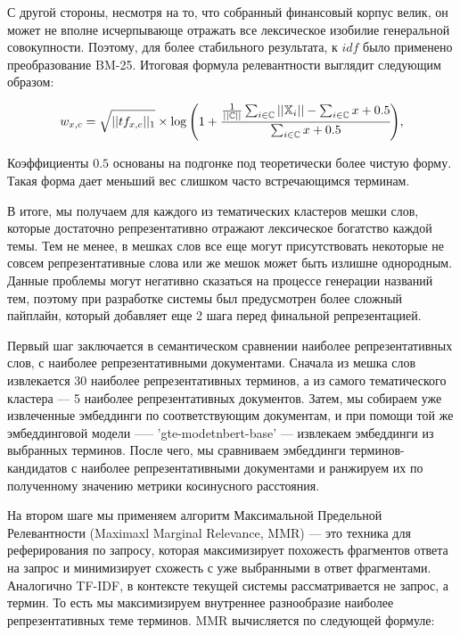 С другой стороны, несмотря на то, что собранный финансовый корпус велик, он может
не вполне исчерпывающе отражать все лексическое изобилие генеральной совокупности.
Поэтому, для более стабильного результата, к $idf$ было применено преобразование BM-25.
Итоговая формула релевантности выглядит следующим образом:

\begin{equation}
    w_{x, c} =
    \sqrt{||tf_{x, c}||_1}
    \times
    \log\Bigg(
        1 + \cfrac{
            \frac{1}{||\mathbb{C}||}\sum_{i \in \mathbb{C}}||\mathbb{X}_i|| - \sum_{i \in \mathbb{C}}x + 0.5
        }{
            \sum_{i \in \mathbb{C}}x + 0.5
        }
    \Bigg),
\end{equation}

Коэффициенты $0.5$ основаны на подгонке под теоретически более чистую форму.
Такая форма дает меньший вес слишком часто встречающимся терминам.

В итоге, мы получаем для каждого из тематических кластеров мешки слов, которые
достаточно репрезентативно отражают лексическое богатство каждой темы. Тем не менее,
в мешках слов все еще могут присутствовать некоторые не совсем репрезентативные слова
или же мешок может быть излишне однородным. Данные проблемы могут негативно сказаться
на процессе генерации названий тем, поэтому при разработке системы был предусмотрен
более сложный пайплайн, который добавляет еще 2 шага перед финальной репрезентацией.

Первый шаг заключается в семантическом сравнении наиболее репрезентативных слов,
с наиболее репрезентативными документами. Сначала из мешка слов извлекается 30 наиболее
репрезентативных терминов, а из самого тематического кластера --- 5 наиболее репрезентативных
документов. Затем, мы собираем уже извлеченные эмбеддинги по соответствующим документам,
и при помощи той же эмбеддинговой модели —-- 'gte-modetnbert-base' --- извлекаем эмбеддинги
из выбранных терминов. После чего, мы сравниваем эмбеддинги терминов-кандидатов с наиболее
репрезентативными документами и ранжируем их по полученному значению метрики косинусного расстояния.

На втором шаге мы применяем алгоритм Максимальной Предельной Релевантности (Maximaxl Marginal Relevance,
MMR) --- это техника для реферирования по запросу, которая максимизирует похожесть фрагментов ответа
на запрос и минимизирует схожесть с уже выбранными в ответ фрагментами. Аналогично TF-IDF, в контексте
текущей системы рассматривается не запрос, а термин. То есть мы максимизируем внутреннее разнообразие
наиболее репрезентативных теме терминов. MMR вычисляется по следующей формуле:


